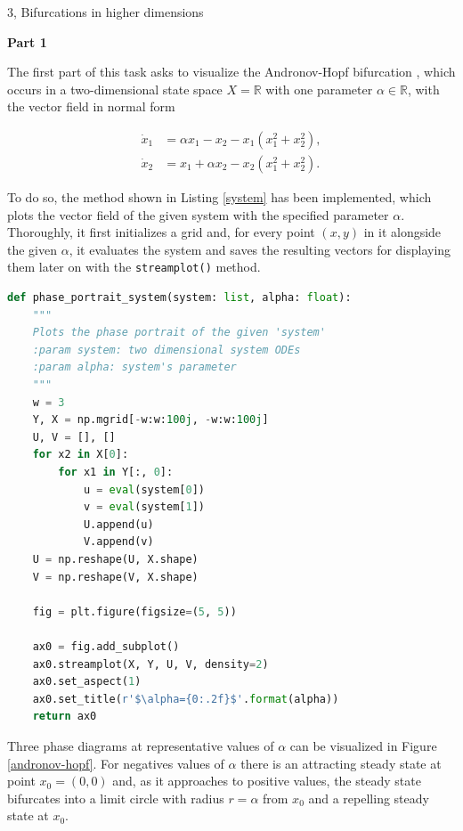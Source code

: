 \documentclass[10pt,a4paper]{article}
\begin{document}
\begin{task}{3, Bifurcations in higher dimensions}

\noindent\textbf{Part 1}

The first part of this task asks to visualize the Andronov-Hopf bifurcation \cite[p.57]{Yuri}, which occurs in a two-dimensional state space $X=\mathbb{R}$ with one parameter $\alpha\in\mathbb{R}$, with the vector field in normal form

\begin{equation}
\begin{aligned}
    \dot{x}_1 &= \alpha {x_1} - x_2 - x_1 ({x_1^2} + {x_2^2}),\\
    \dot{x}_2 &= x_1 + \alpha x_2 - x_2 ({x_1^2} + {x_2^2}).
\end{aligned}
\end{equation}

To do so, the method shown in Listing \ref{system} has been implemented, which plots the vector field of the given system with the specified parameter $\alpha$. Thoroughly, it first initializes a grid and, for every point $(x, y)$ in it alongside the given $\alpha$, it evaluates the system and saves the resulting vectors for displaying them later on with the \texttt{streamplot()} method.

\begin{lstlisting}[language = Python, caption={Method for plotting the vector field of a two-dimensional system}, label={system}]
def phase_portrait_system(system: list, alpha: float):
    """
    Plots the phase portrait of the given 'system'
    :param system: two dimensional system ODEs
    :param alpha: system's parameter
    """
    w = 3
    Y, X = np.mgrid[-w:w:100j, -w:w:100j]
    U, V = [], []
    for x2 in X[0]:
        for x1 in Y[:, 0]:
            u = eval(system[0])
            v = eval(system[1])
            U.append(u)
            V.append(v)
    U = np.reshape(U, X.shape)
    V = np.reshape(V, X.shape)
    
    fig = plt.figure(figsize=(5, 5))

    ax0 = fig.add_subplot()
    ax0.streamplot(X, Y, U, V, density=2)
    ax0.set_aspect(1)
    ax0.set_title(r'$\alpha={0:.2f}$'.format(alpha))
    return ax0
\end{lstlisting}

Three phase diagrams at representative values of $\alpha$ can be visualized in Figure \ref{andronov-hopf}. For negatives values of $\alpha$ there is an attracting steady state at point $x_0 = (0, 0)$ and, as it approaches to positive values, the steady state bifurcates into a limit circle with radius $r = \alpha$ from $x_0$ and a repelling steady state at $x_0$.


\end{task}
\end{document}
